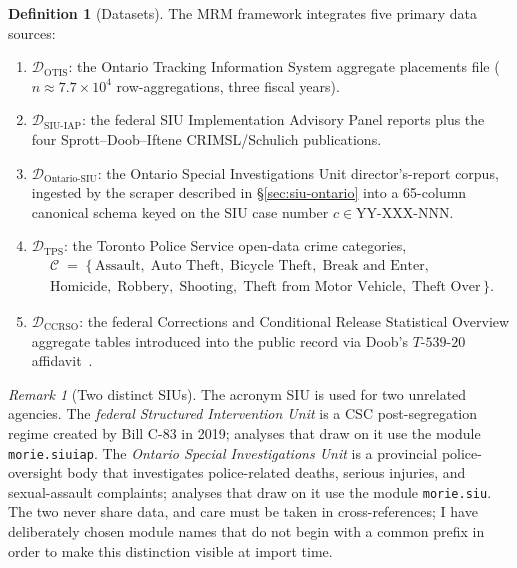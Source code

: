\documentclass[11pt,a4paper]{article}
\theoremstyle{plain}
\theoremstyle{definition}
\newtheorem{definition}[theorem]{Definition}
\theoremstyle{remark}
\newtheorem{remark}[theorem]{Remark}
\begin{document}
\begin{definition}[Datasets]
\label{def:datasets}
The MRM framework integrates five primary data sources:
\begin{enumerate}
  \item $\mathcal{D}_{\mathrm{OTIS}}$: the Ontario Tracking
        Information System aggregate placements file
        ($n \approx 7.7\times 10^{4}$ row-aggregations, three
        fiscal years).
  \item $\mathcal{D}_{\mathrm{SIU}\text{-}\mathrm{IAP}}$: the
        federal SIU Implementation Advisory Panel reports plus
        the four Sprott--Doob--Iftene CRIMSL/Schulich
        publications.
  \item $\mathcal{D}_{\mathrm{Ontario}\text{-}\mathrm{SIU}}$: the
        Ontario Special Investigations Unit director's-report
        corpus, ingested by the scraper described in
        \S\ref{sec:siu-ontario} into a 65-column canonical schema
        keyed on the SIU case number $c \in \mathrm{YY\text{-}XXX\text{-}NNN}$.
  \item $\mathcal{D}_{\mathrm{TPS}}$: the Toronto Police Service
        open-data crime categories,
        \begin{multline*}
          \mathcal{C} \;=\; \{\,
            \text{Assault},\;
            \text{Auto Theft},\;
            \text{Bicycle Theft},\;
            \text{Break and Enter},\\
            \text{Homicide},\;
            \text{Robbery},\;
            \text{Shooting},\;
            \text{Theft from Motor Vehicle},\;
            \text{Theft Over}\,\}.
        \end{multline*}
  \item $\mathcal{D}_{\mathrm{CCRSO}}$: the federal Corrections
        and Conditional Release Statistical Overview
        aggregate tables introduced into the public record via
        Doob's $T$-$539$-$20$ affidavit~\cite{Doob2020Affidavit}.
\end{enumerate}
\end{definition}

\begin{remark}[Two distinct SIUs]
\label{rmk:two-siu}
The acronym SIU is used for two unrelated agencies. The
\emph{federal Structured Intervention Unit} is a CSC
post-segregation regime created by Bill C-83 in 2019; analyses
that draw on it use the module \texttt{morie.siuiap}. The
\emph{Ontario Special Investigations Unit} is a provincial
police-oversight body that investigates police-related deaths,
serious injuries, and sexual-assault complaints; analyses that
draw on it use the module \texttt{morie.siu}. The two never
share data, and care must be taken in cross-references; I have
deliberately chosen module names that do not begin with a common
prefix in order to make this distinction visible at import time.
\end{remark}
\end{document}
